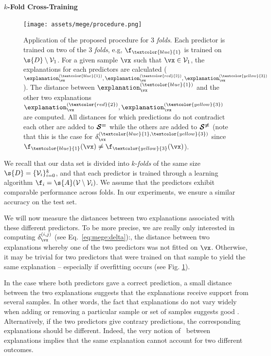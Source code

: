 \paragraph{$k$-Fold Cross-Training}

\begin{figure*}[ht]
  \centering
  \texttt{[image: assets/mege/procedure.png]}
  \caption{Application of the proposed procedure for $3$ \textit{folds}. Each predictor is trained on two of the 3 \textit{folds}, e.g, $\f_{\textcolor{blue}{1}}$ is trained on $\s{D} \setminus \fold_1$. For a given sample $\vx$ such that $\vx \in \fold_1$, the explanations for each predictors are calculated ($\explanation_{\vx}^{(\textcolor{blue}{1})}, \explanation_{\vx}^{(\textcolor{red}{2})}, \explanation_{\vx}^{(\textcolor{yellow}{3})}$). The distance between $\explanation_{\vx}^{(\textcolor{blue}{1})}$ and the  other two explanations  $\explanation_{\vx}^{(\textcolor{red}{2})}, \explanation_{\vx}^{(\textcolor{yellow}{3})}$ are computed. 
  All distances for which predictions do not contradict each other are added to $\boldsymbol{\mathcal{S}^{ = }}$ while the others are added to $\boldsymbol{\mathcal{S}^{ \ne }}$ (note that this is the case for $\delta^{(\textcolor{blue}{1},\textcolor{yellow}{3})}_{\vx}$ since $\f_{\textcolor{blue}{1}}(\vx) \neq \f_{\textcolor{yellow}{3}}(\vx)$).
  }
  \label{fig:mege:methodology}
\end{figure*}

We recall that our data set is divided into $k$-\textit{folds} of the same size $\s{D} = \{\fold_i\}_{i=0}^k$, and that each predictor is trained through a learning algorithm $\f_i = \s{A}(\fold \setminus \fold_i)$.
We assume that the predictors exhibit comparable performance across folds. In our experiments, we ensure a similar accuracy on the test set.

We will now measure the distances between two explanations associated with these different predictors.
To be more precise, we are really only interested in computing $\deltaij$ (see Eq.~\ref{eq:mege:delta}):, the distance between two explanations whereby one of the two predictors was not fitted on $\vx$. Otherwise, it may be trivial for two predictors that were trained on that sample to yield the same explanation -- especially if overfitting occurs (see Fig. \ref{fig:mege:methodology}).

In the case where both predictors gave a correct prediction, a small distance between the two explanations suggests that the explanations receive support from several samples. In other words, the fact that  explanations do not vary widely when adding or removing a particular sample or set of samples suggests good \representativity. Alternatively, if the two predictors give contrary predictions, the corresponding explanations should be different. Indeed, the very notion of \consistency~between explanations implies that the same explanation cannot account for two different outcomes. 

